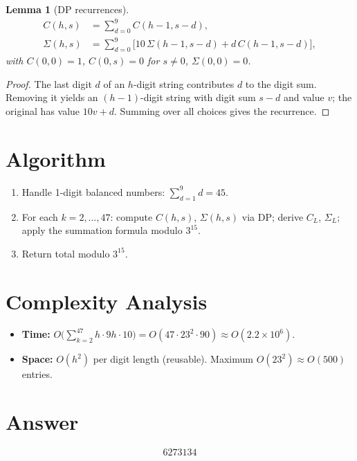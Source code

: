 \documentclass[12pt]{article}
\newtheorem{lemma}[theorem]{Lemma}
\begin{document}
\begin{lemma}[DP recurrences]
\begin{align*}
C(h,s) &= \sum_{d=0}^{9} C(h{-}1, s{-}d), \\
\Sigma(h,s) &= \sum_{d=0}^{9}\bigl[10\,\Sigma(h{-}1,s{-}d) + d\,C(h{-}1,s{-}d)\bigr],
\end{align*}
with $C(0,0)=1$, $C(0,s)=0$ for $s\neq 0$, $\Sigma(0,0)=0$.
\end{lemma}

\begin{proof}
The last digit $d$ of an $h$-digit string contributes $d$ to the digit sum. Removing it yields an $(h{-}1)$-digit string with digit sum $s-d$ and value $v$; the original has value $10v+d$. Summing over all choices gives the recurrence.
\end{proof}

\section{Algorithm}

\begin{enumerate}
\item Handle 1-digit balanced numbers: $\sum_{d=1}^{9} d = 45$.
\item For each $k = 2, \ldots, 47$: compute $C(h,s)$, $\Sigma(h,s)$ via DP; derive $C_L$, $\Sigma_L$; apply the summation formula modulo $3^{15}$.
\item Return total modulo $3^{15}$.
\end{enumerate}

\section{Complexity Analysis}

\begin{itemize}
\item \textbf{Time:} $O\bigl(\sum_{k=2}^{47} h \cdot 9h \cdot 10\bigr) = O(47 \cdot 23^2 \cdot 90) \approx O(2.2 \times 10^6)$.
\item \textbf{Space:} $O(h^2)$ per digit length (reusable). Maximum $O(23^2) \approx O(500)$ entries.
\end{itemize}

\section{Answer}

\[
\boxed{6273134}
\]
\end{document}
